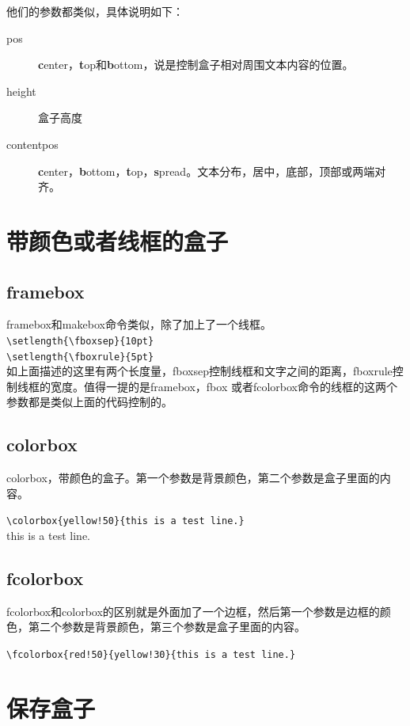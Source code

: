 \documentclass[12pt,oneside]{book}
\begin{document}
\begin{common-format}
他们的参数都类似，具体说明如下：
\begin{description}
\item[pos] \textbf{c}enter，\textbf{t}op和\textbf{b}ottom，说是控制盒子相对周围文本内容的位置。
\item[height] 盒子高度
\item[contentpos] \textbf{c}enter，\textbf{b}ottom，\textbf{t}op，\textbf{s}pread。文本分布，居中，底部，顶部或两端对齐。
\end{description}


\section{带颜色或者线框的盒子}
\subsection{framebox}
framebox和makebox命令类似，除了加上了一个线框。\\
\verb+\setlength{\fboxsep}{10pt}+\\
\verb+\setlength{\fboxrule}{5pt}+\\
如上面描述的这里有两个长度量，fboxsep控制线框和文字之间的距离，fboxrule控制线框的宽度。值得一提的是framebox，fbox 或者fcolorbox命令的线框的这两个参数都是类似上面的代码控制的。


\subsection{colorbox}
colorbox，带颜色的盒子。第一个参数是背景颜色，第二个参数是盒子里面的内容。

\verb+\colorbox{yellow!50}{this is a test line.}+\\
\colorbox{yellow!50}{this is a test line.}

\subsection{fcolorbox}
fcolorbox和colorbox的区别就是外面加了一个边框，然后第一个参数是边框的颜色，第二个参数是背景颜色，第三个参数是盒子里面的内容。

\verb+\fcolorbox{red!50}{yellow!30}{this is a test line.}+\\



\section{保存盒子}

\end{common-format}
\end{document}
